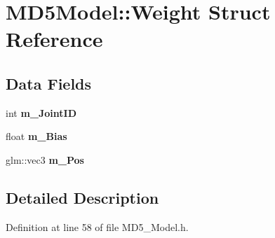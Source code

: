 \hypertarget{struct_m_d5_model_1_1_weight}{}\section{M\+D5\+Model\+:\+:Weight Struct Reference}
\label{struct_m_d5_model_1_1_weight}
\subsection*{Data Fields}
\begin{DoxyCompactItemize}
\item 
int {\bfseries m\+\_\+\+Joint\+ID}\hypertarget{struct_m_d5_model_1_1_weight_ad8f3bc072beedbdc4d4b434641cc989f}{}\label{struct_m_d5_model_1_1_weight_ad8f3bc072beedbdc4d4b434641cc989f}

\item 
float {\bfseries m\+\_\+\+Bias}\hypertarget{struct_m_d5_model_1_1_weight_a4a08faf9d80ff158562c6e1a0122813e}{}\label{struct_m_d5_model_1_1_weight_a4a08faf9d80ff158562c6e1a0122813e}

\item 
glm\+::vec3 {\bfseries m\+\_\+\+Pos}\hypertarget{struct_m_d5_model_1_1_weight_ad3caaf7d088dc5d9b241f94da870779c}{}\label{struct_m_d5_model_1_1_weight_ad3caaf7d088dc5d9b241f94da870779c}

\end{DoxyCompactItemize}


\subsection{Detailed Description}


Definition at line 58 of file M\+D5\+\_\+\+Model.\+h.

